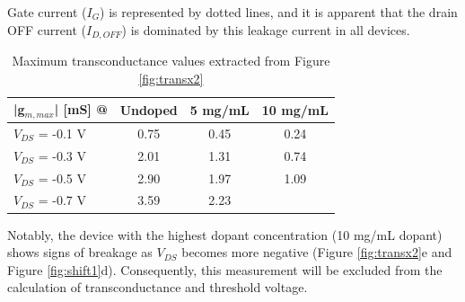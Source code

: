 Gate current ($I_{G}$) is represented by dotted lines, and it is apparent that the drain OFF current ($I_{D,OFF}$) is dominated by this leakage current in all devices. %

\begin{table}[ht]
\centering
\caption{Maximum transconductance values extracted from Figure \ref{fig:transx2}}
\begin{tabular}{l|c|c|c}
|g$_{m,max}$| [mS] @ & Undoped & 5 mg/mL & 10 mg/mL \\\hline
$V_{DS}$ = -0.1 V & 0.75 & 0.45 & 0.24\\
$V_{DS}$ = -0.3 V & 2.01 & 1.31 & 0.74\\
$V_{DS}$ = -0.5 V & 2.90 & 1.97 & 1.09\\
$V_{DS}$ = -0.7 V & 3.59 & 2.23 & \\ \hline
\end{tabular}
\label{tab:trans}
\end{table}

Notably, the device with the highest dopant concentration (10 mg/mL dopant) shows signs of breakage as $V_{DS}$ becomes more negative (Figure \ref{fig:transx2}e and Figure \ref{fig:shift1}d). Consequently, this measurement will be excluded from the calculation of transconductance and threshold voltage.

